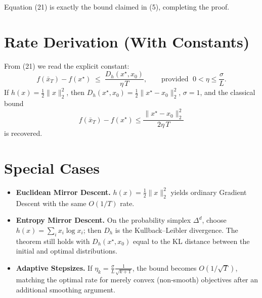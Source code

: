 \documentclass{article}
\begin{document}
Equation (21) is exactly the bound claimed in (5), completing the proof. \hfill\qedsymbol

\section*{Rate Derivation (With Constants)}
From (21) we read the explicit constant:
\[
\boxed{
\displaystyle
f(\bar x_{T})-f(x^{\star})\;\le\;
\frac{D_{h}(x^{\star},x_{0})}{\eta\,T},
\qquad
\text{provided }\;0<\eta\le\frac{\sigma}{L}.
}
\]
If $h(x)=\tfrac12\|x\|_{2}^{2}$, then $D_{h}(x^{\star},x_{0})=\tfrac12\|x^{\star}-x_{0}\|_{2}^{2}$, $\sigma=1$, and the classical bound
\[
f(\bar x_{T})-f(x^{\star})\le \frac{\|x^{\star}-x_{0}\|_{2}^{2}}{2\eta\,T}
\]
is recovered.

\section*{Special Cases}
\begin{itemize}
\item \textbf{Euclidean Mirror Descent.} $h(x)=\frac12\|x\|_{2}^{2}$ yields ordinary Gradient Descent with the same $O(1/T)$ rate.
\item \textbf{Entropy Mirror Descent.} On the probability simplex $\Delta^{d}$, choose $h(x)=\sum_{i}x_{i}\log x_{i}$; then $D_{h}$ is the Kullback–Leibler divergence. The theorem still holds with $D_{h}(x^{\star},x_{0})$ equal to the KL distance between the initial and optimal distributions.
\item \textbf{Adaptive Stepsizes.} If $\eta_{k}=\frac{\sigma}{L}\frac{1}{\sqrt{k+1}}$, the bound becomes $O(1/\sqrt{T})$, matching the optimal rate for merely convex (non‑smooth) objectives after an additional smoothing argument.
\end{itemize}
\end{document}

